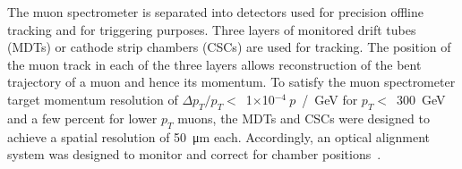 The muon spectrometer is separated into detectors used for precision offline tracking and for triggering purposes. Three layers of monitored drift tubes (MDTs) or cathode strip chambers (CSCs) are used for tracking. The position of the muon track in each of the three layers allows reconstruction of the bent trajectory of a muon and hence its momentum. To satisfy the muon spectrometer target momentum resolution of $\Delta p_T / p_T <$~1$\times$10$^{-4}~p$~/~GeV for $p_T <$~300~GeV and a few percent for lower $p_T$ muons, the MDTs and CSCs were designed to achieve a spatial resolution of \SI{50}{\micro\meter} each. Accordingly, an optical alignment system was designed to monitor and correct for chamber positions~\cite{atlas_muon_spectrometer_tdr, aefsky_optical_2008}. 

